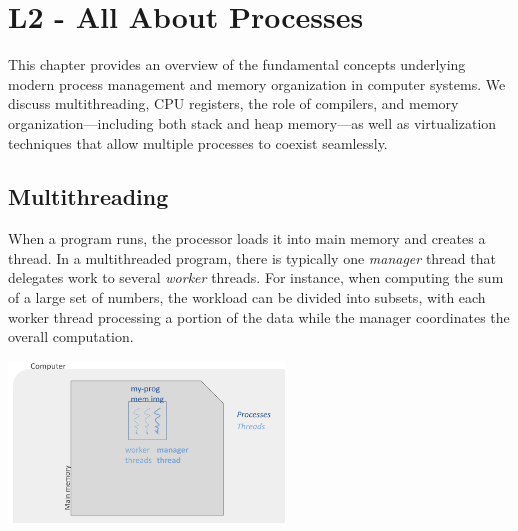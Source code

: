 \documentclass[../../compsys.tex]{subfiles}
\begin{document}
\chapter{L2 - All About Processes}
This chapter provides an overview of the fundamental concepts underlying modern process management and memory organization in computer systems. We discuss multithreading, CPU registers, the role of compilers, and memory organization—including both stack and heap memory—as well as virtualization techniques that allow multiple processes to coexist seamlessly.
\small
\section{Multithreading}
When a program runs, the processor loads it into main memory and creates a thread. In a multithreaded program, there is typically one \emph{manager} thread that delegates work to several \emph{worker} threads. For instance, when computing the sum of a large set of numbers, the workload can be divided into subsets, with each worker thread processing a portion of the data while the manager coordinates the overall computation.

\begin{center}
    \includegraphics[width=0.55\textwidth]{chapters/L2/images/multi_threads.png}
\end{center}
\end{document}
